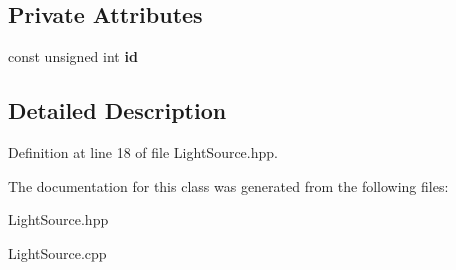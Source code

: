 \subsection*{Private Attributes}
\begin{DoxyCompactItemize}
\item 
\hypertarget{class_light_source_afe608031bd750a8ed3ea4e65c5b6e892}{const unsigned int {\bfseries id}}\label{class_light_source_afe608031bd750a8ed3ea4e65c5b6e892}

\end{DoxyCompactItemize}


\subsection{Detailed Description}


Definition at line 18 of file Light\-Source.\-hpp.



The documentation for this class was generated from the following files\-:\begin{DoxyCompactItemize}
\item 
Light\-Source.\-hpp\item 
Light\-Source.\-cpp\end{DoxyCompactItemize}
